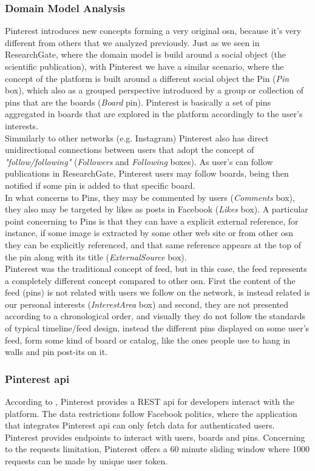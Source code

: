 \subsubsection*{Domain Model Analysis}
Pinterest introduces new concepts forming a very original \gls{osn}, because it's very different from others that we analyzed previously. Just as we seen in ResearchGate, where the domain model is build around a social object (the scientific publication), with Pinterest we have a similar scenario, where the concept of the platform is built around a different social object the Pin (\textit{Pin} box), which also as a grouped perspective introduced by a group or collection of pins that are the boards (\textit{Board} pin). Pinterest is basically a set of pins aggregated in boards that are explored in the platform accordingly to the user's interests.\\
\indent Simmilarly to other networks (e.g. Instagram) Pinterest also has direct unidirectional connections between users that adopt the concept of \textit{"follow/following"} (\textit{Followers} and \textit{Following} boxes). As user's can follow publications in ResearchGate, Pinterest users may follow boards, being then notified if some pin is added to that specific board.\\
\indent In what concerns to Pins, they may be commented by users (\textit{Comments} box), they also may be targeted by likes as posts in Facebook (\textit{Likes} box). A particular point concerning to Pins is that they can have a explicit external reference, for instance, if some image is extracted by some other web site or from other \gls{osn} they can be explicitly referenced, and that same reference appears at the top of the pin along with its title (\textit{ExternalSource} box).\\
\indent Pinterest was the traditional concept of feed, but in this case, the feed represents a completely different concept compared to other \gls{osn}. First the content of the feed (pins) is not related with users we follow on the network, is instead related is our personal interests (\textit{InterestArea} box) and second, they are not presented according to a chronological order, and visually they do not follow the standards of typical timeline/feed design, instead the different pins displayed on some user's feed, form some kind of board or catalog, like the ones people use to hang in walls and pin post-its on it.

\subsubsection*{Pinterest \gls{api}}
According to \cite{pintdev}, Pinterest provides a REST \gls{api} for developers interact with the platform. The data restrictions follow Facebook politics, where the application that integrates Pinterest \gls{api} can only fetch data for authenticated users. Pinterest provides endpoints to interact with users, boards and pins. Concerning to the requests limitation, Pinterest offers a 60 minute sliding window where 1000 requests can be made by unique user token.

